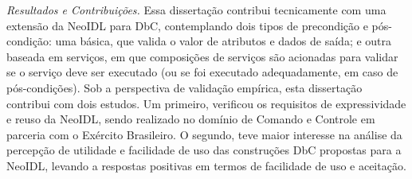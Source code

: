 \emph{Resultados e Contribuições.}
Essa dissertação contribui tecnicamente com uma extensão da NeoIDL para DbC, contemplando
dois tipos de precondição e pós-condição: uma básica, que valida o valor de
atributos e dados de saída; e outra baseada em
serviços, em que composições de serviços são acionadas para validar se o serviço
deve ser executado (ou se foi executado adequadamente, em caso de pós-condições). %
Sob a perspectiva de validação empírica, esta dissertação contribui com dois estudos.
Um primeiro, verificou
os requisitos de expressividade e reuso da NeoIDL, sendo realizado no
domínio de Comando e Controle em parceria com o Exército Brasileiro. O segundo,
teve maior interesse na análise da percepção de utilidade e facilidade de uso
das construções DbC propostas para a NeoIDL, levando a respostas positivas em
termos de facilidade de uso e aceitação.
%
%

  
\clearpage



